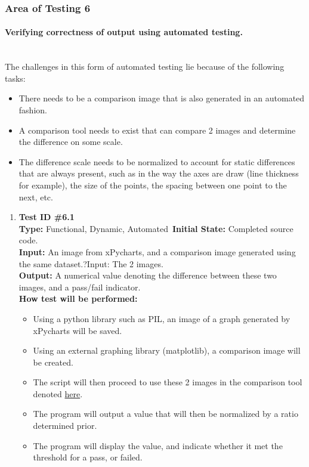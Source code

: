 \documentclass[12pt, titlepage]{article}
\begin{document}
\subsubsection{Area of Testing 6}		
	\paragraph{Verifying correctness of output using automated testing.\\\\}
	The challenges in this form of automated testing lie because of the following tasks:
	\begin{itemize}[label={--}]
		\item There needs to be a comparison image that is also generated in an automated fashion. 
		\item	A comparison tool needs to exist that can compare 2 images and determine the difference on some scale.
		\item	The difference scale needs to be normalized to account for static differences that are always present, such as in the way the axes are draw (line thickness for example), the size of the points, the spacing between one point to the next, etc. 
	\end{itemize}	
		\begin{enumerate}
			\item{\textbf{Test ID \#6.1\\}}
			\textbf{Type:} Functional, Dynamic, Automated\
			\textbf{Initial State:} Completed source code. \\
			\textbf{Input:} An image from xPycharts, and a comparison image generated using the same dataset.?Input: The 2 images.\\
			\textbf{Output:}  A numerical value denoting the difference between these two images, and a pass/fail indicator.\\
			\textbf{How test will be performed:}
				\begin{itemize}[label={--}]
					\item Using a python library such as PIL, an image of a graph generated by xPycharts will be saved.
					\item Using an external graphing library (matplotlib), a comparison image will be created.
					\item The script will then proceed to use these 2 images in the comparison tool denoted \href{http://www.pyimagesearch.com/2014/09/15/python-compare-two-images/}{here}.
					\item The program will output a value that will then be normalized by a ratio determined prior.
					\item The program will display the value, and indicate whether it met the threshold for a pass, or failed.							
				\end{itemize}
		\end{enumerate}		
	
\end{document}
